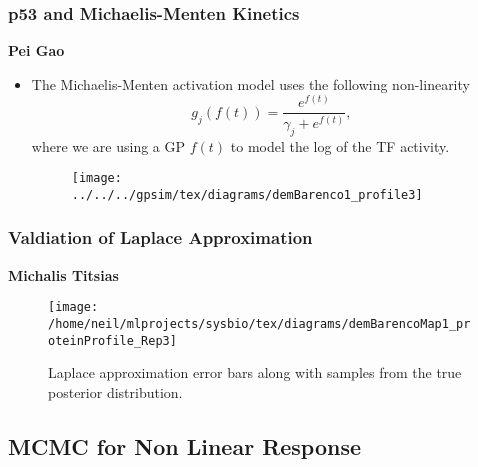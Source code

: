 \begin{frame}
  \frametitle{p53 and Michaelis-Menten Kinetics}

  \begin{flushright}
    \textbf{Pei Gao}
    \par\end{flushright}
  \begin{itemize}
  \item The Michaelis-Menten activation model uses the following non-linearity
    \[
    g_{j}\left(f\left(t\right)\right)=\frac{e^{f\left(t\right)}}{\gamma_{j}+e^{f\left(t\right)}},\]
    where we are using a GP $f\left(t\right)$ to model the log of the
    TF activity. %
    \begin{figure}
      \centering{} \label{fig:mlpact:a} \texttt{[image: ../../../gpsim/tex/diagrams/demBarenco1\_profile3]}
      \hfill{}\label{fig:mlpact:b}  
    \end{figure}

  \end{itemize}

\end{frame}

\begin{frame}
  \frametitle{Valdiation of Laplace Approximation}

  \begin{flushright}
    \textbf{Michalis Titsias}
    \par\end{flushright}

  \begin{figure}
    \begin{centering}
      \texttt{[image: /home/neil/mlprojects/sysbio/tex/diagrams/demBarencoMap1\_proteinProfile\_Rep3]}
      \par\end{centering}

    \caption{Laplace approximation error bars along with samples from the true
      posterior distribution.}

  \end{figure}




\end{frame}

\subsection{MCMC for Non Linear Response}


